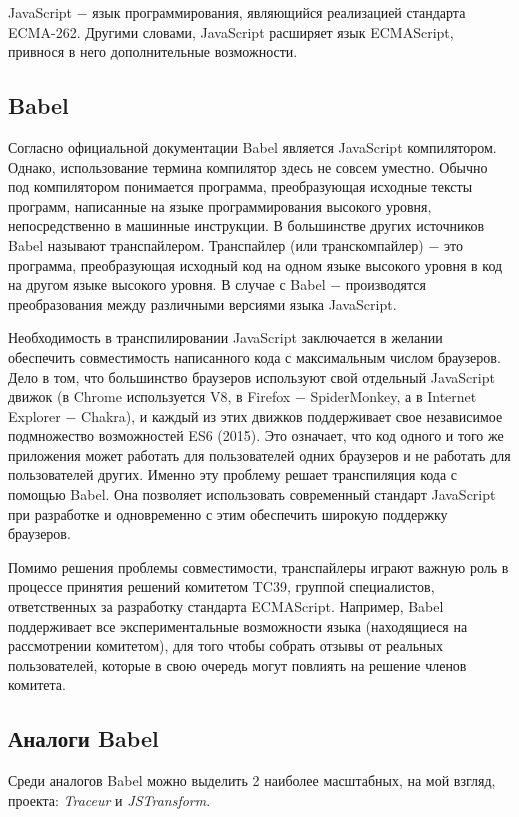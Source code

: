 \documentclass[14pt, a4paper]{article}
\begin{document}
JavaScript $-$ язык программирования, являющийся реализацией стандарта ECMA-262. Другими словами, 
JavaScript расширяет язык ECMAScript, привнося в него дополнительные возможности.

\subsection{Babel}
Согласно официальной документации \cite{documentation} Babel является JavaScript компилятором. Однако, 
использование термина компилятор здесь не совсем уместно. Обычно под компилятором понимается программа, 
преобразующая исходные тексты программ, написанные на языке программирования высокого уровня, 
непосредственно в машинные инструкции. В большинстве других источников Babel называют транспайлером. 
Транспайлер (или транскомпайлер) $-$ это программа, преобразующая исходный код на одном языке высокого 
уровня в код на другом языке высокого уровня. В случае с Babel $-$ производятся преобразования между 
различными версиями языка JavaScript.

Необходимость в транспилировании JavaScript заключается в желании обеспечить совместимость написанного 
кода с максимальным числом браузеров. Дело в том, что большинство браузеров используют свой отдельный 
JavaScript движок (в Chrome используется V8, в Firefox $-$ SpiderMonkey, а в Internet Explorer $-$ Chakra), 
и каждый из этих движков поддерживает свое независимое подмножество возможностей ES6 (2015). Это 
означает, что код одного и того же приложения может работать для пользователей одних браузеров и не 
работать для пользователей других. Именно эту проблему решает транспиляция кода с помощью Babel. Она 
позволяет использовать современный стандарт JavaScript при разработке и одновременно с этим обеспечить 
широкую поддержку браузеров.

Помимо решения проблемы совместимости, транспайлеры играют важную роль в процессе принятия решений 
комитетом TC39, группой специалистов, ответственных за разработку стандарта ECMAScript. Например, 
Babel поддерживает все экспериментальные возможности языка (находящиеся на рассмотрении комитетом), 
для того чтобы собрать отзывы от реальных пользователей, которые в свою очередь могут повлиять на 
решение членов комитета.


\subsection{Аналоги Babel}
Среди аналогов Babel можно выделить 2 наиболее масштабных, на мой взгляд, проекта: 
\textit{Traceur} и \textit{JSTransform}.
\end{document}
